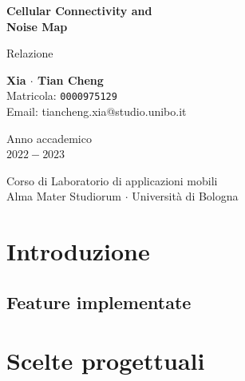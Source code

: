 \documentclass[11pt]{article}
\begin{document}
\begin{titlepage}
    \begin{center}
        \vspace*{5cm}
            
        \Huge
        \textbf{Cellular Connectivity and\\Noise Map}
            
        \vspace{0.5cm}
        \LARGE
        Relazione
            
        \vspace{1cm}
          
		\hfill
		\begin{center}
        	{\large{\bf Xia $\cdot$ Tian Cheng}}\\[-0.2em]
			{\large Matricola: \texttt{0000975129}}\\[-0.2em]
			{\large Email: tiancheng.xia@studio.unibo.it}
        \end{center}
            
        \vspace{4cm}
            
        Anno accademico\\
        $2022 - 2023$
            
        \vspace{0.8cm}
            
            
        \Large
        Corso di Laboratorio di applicazioni mobili\\
        Alma Mater Studiorum $\cdot$ Università di Bologna\\
            
    \end{center}
\end{titlepage}
\newpage

\tableofcontents
\newpage



\section{Introduzione}

\subsection{Feature implementate}




\section{Scelte progettuali}
\end{document}
